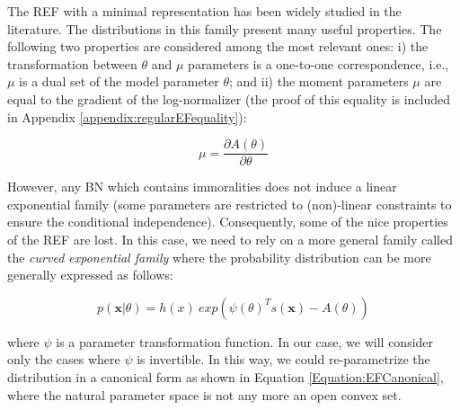 \documentclass[11pt, oneside]{article}   	%
\newcommand{\bm}{\mathbf}
\numberwithin{figure}{section}
\numberwithin{equation}{section}
\numberwithin{table}{section}
\theoremstyle{definition}
\begin{document}
The REF with a minimal representation has been widely studied in the literature. The distributions in this family present many useful properties. The following two properties are considered among the most relevant ones: i)  the transformation between $\theta$ and $\mu$ parameters is a one-to-one correspondence, i.e., $\mu$ is a dual set of the model parameter $\theta$; and ii) the moment parameters $\mu$ are equal to the gradient of the log-normalizer (the proof of this equality is included in Appendix \ref{appendix:regularEFequality}):

\begin{equation}
\label{Equation:RegularEFEquality}
\mu = \frac{\partial A(\theta)}{\partial \theta}
\end{equation}


However, any BN which contains immoralities does not induce a linear exponential family (some parameters are restricted to (non)-linear constraints to ensure the conditional independence). Consequently, some of the nice properties of the REF are lost. In this case, we need to rely on a more general family called the \textit{curved exponential family} where the probability distribution can be more generally expressed as follows:

\begin{equation*}
p(\bm x |\theta) = h(x)~exp(\psi(\theta)^Ts(\bm x) - A(\theta) )
\end{equation*}

\noindent where $\psi$ is  a parameter transformation function. In our case, we will consider only the cases where $\psi$ is invertible. In this way, we could re-parametrize the distribution in a canonical form as shown in Equation \ref{Equation:EFCanonical}, where the natural parameter space is not any more an open convex set.
\end{document}
